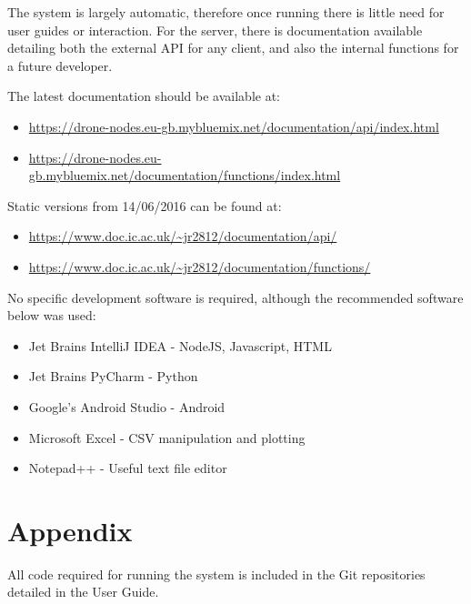 \documentclass{article}
\begin{document}
\vspace{\baselineskip}

The system is largely automatic, therefore once running there is little need for user guides or interaction. For the server, there is documentation available detailing both the external API for any client, and also the internal functions for a future developer. 

The latest documentation should be available at:
\begin{itemize}
	\item \url{https://drone-nodes.eu-gb.mybluemix.net/documentation/api/index.html}
	\item \url{https://drone-nodes.eu-gb.mybluemix.net/documentation/functions/index.html}
\end{itemize}
Static versions from 14/06/2016 can be found at:
\begin{itemize}
	\item \url{https://www.doc.ic.ac.uk/~jr2812/documentation/api/}
	\item \url{https://www.doc.ic.ac.uk/~jr2812/documentation/functions/}
\end{itemize}

\vspace{\baselineskip}

No specific development software is required, although the recommended software below was used:
\begin{itemize}
	\item Jet Brains IntelliJ IDEA - NodeJS, Javascript, HTML
	\item Jet Brains PyCharm - Python
	\item Google's Android Studio - Android
	\item Microsoft Excel - CSV manipulation and plotting
	\item Notepad++ - Useful text file editor
\end{itemize}



\section{Appendix}
All code required for running the system is included in the Git repositories detailed in the User Guide.
\end{document}
